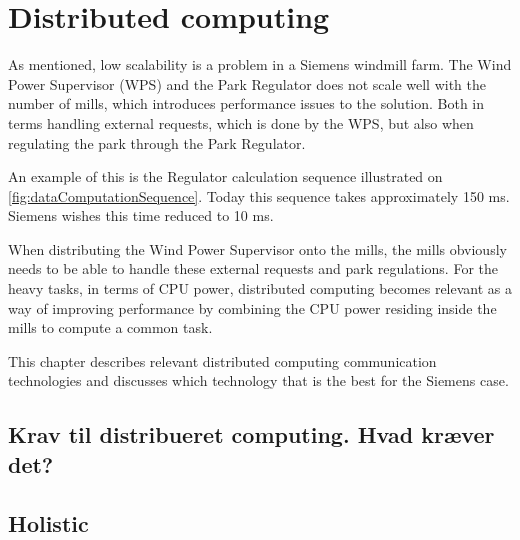 \chapter{Distributed computing}
As mentioned, low scalability is a problem in a Siemens windmill farm. The Wind Power Supervisor (WPS) and the Park Regulator does not scale well with the number of mills, which introduces performance issues to the solution. Both in terms handling external requests, which is done by the WPS, but also when regulating the park through the Park Regulator. 

An example of this is the Regulator calculation sequence illustrated on \cref{fig:dataComputationSequence}. Today this sequence takes approximately 150 ms. Siemens wishes this time reduced to 10 ms.

When distributing the Wind Power Supervisor onto the mills, the mills obviously needs to be able to handle these external requests and park regulations. For the heavy tasks, in terms of CPU power, distributed computing becomes relevant as a way of improving performance by combining the CPU power residing inside the mills to compute a common task. 

This chapter describes relevant distributed computing communication technologies and discusses which technology that is the best for the Siemens case. 




\section{Krav til distribueret computing. Hvad kræver det?}


\section{Holistic}